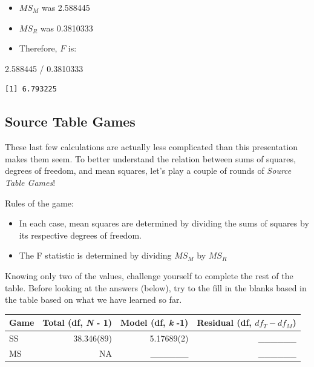 \documentclass[
  english,
]{book}
\newenvironment{Shaded}{\begin{snugshade}}{\end{snugshade}}
\newcommand{\FloatTok}[1]{\textcolor[rgb]{0.00,0.00,0.81}{#1}}
\newcommand{\SpecialCharTok}[1]{\textcolor[rgb]{0.00,0.00,0.00}{#1}}
\providecommand{\tightlist}{%
  \setlength{\itemsep}{0pt}\setlength{\parskip}{0pt}}
\begin{document}
\begin{itemize}
\tightlist
\item
  \(MS_M\) was 2.588445
\item
  \(MS_R\) was 0.3810333
\item
  Therefore, \(F\) is:
\end{itemize}

\begin{Shaded}
\begin{Highlighting}[]
\FloatTok{2.588445} \SpecialCharTok{/} \FloatTok{0.3810333}
\end{Highlighting}
\end{Shaded}

\begin{verbatim}
[1] 6.793225
\end{verbatim}

\hypertarget{source-table-games}{%
\subsection{Source Table Games}\label{source-table-games}}

These last few calculations are actually less complicated than this presentation makes them seem. To better understand the relation between sums of squares, degrees of freedom, and mean squares, let's play a couple of rounds of \emph{Source Table Games}!

Rules of the game:

\begin{itemize}
\tightlist
\item
  In each case, mean squares are determined by dividing the sums of squares by its respective degrees of freedom.
\item
  The F statistic is determined by dividing \(MS_M\) by \(MS_R\)
\end{itemize}

Knowing only two of the values, challenge yourself to complete the rest of the table. Before looking at the answers (below), try to the fill in the blanks based in the table based on what we have learned so far.

\begin{longtable}[]{@{}lrrr@{}}
\toprule
Game & Total (df, \emph{N} - 1) & Model (df, \emph{k} -1) & Residual (df, \(df_T - df_M\)) \\
\midrule
\endhead
SS & 38.346(89) & 5.17689(2) & \_\_\_\_\_\_ \\
MS & NA & \_\_\_\_\_\_ & \_\_\_\_\_\_ \\
\bottomrule
\end{longtable}
\end{document}
